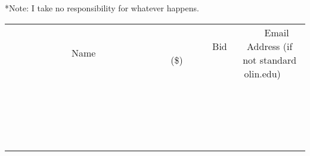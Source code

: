 \documentclass[11pt]{article}
\begin{document}
*Note: I take no responsibility for whatever happens.
\\[3ex]
\begin{tabular}{c c c}
~~~~~~~~~~~~~Name~~~~~~~~~~~~~ & ~~~~~~~~~Bid (\$)~~~~~~~~~  & ~~~Email Address (if not standard olin.edu)~~~\\
 & & \\
\hline
 & & \\
\hline
 & & \\
\hline
 & & \\
\hline
 & & \\
\hline
 & & \\
\hline
 & & \\
\hline
 & & \\
\hline
 & & \\
\hline
 & & \\
\hline
 & & \\
\hline
 & & \\
\hline
 & & \\
\hline
 & & \\
\hline
 & & \\
\hline
 & & \\
\hline
 & & \\
\hline
 & & \\
\hline
 & & \\
\hline
\end{tabular}
\newpage
\end{document}
